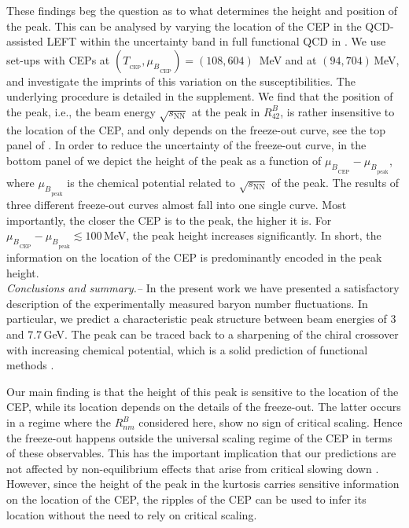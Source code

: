 \documentclass[reprint,twocolumn,superscriptaddress,preprintnumbers,amsmath,amssymb,aps,prd,floatfix]{revtex4-2}
\begin{document}
These findings beg the question as to what determines the height and position of the peak. This can be analysed by varying the location of the CEP in the QCD-assisted LEFT within the uncertainty band in full functional QCD in  . We use set-ups  with CEPs at $(T_{_{\mathrm{CEP}}},{\mu_B}_{_{\mathrm{CEP}}})=(108, 604)$ \,MeV and at $(94, 704)$\,MeV, and investigate the imprints of this variation on the susceptibilities. The underlying procedure is detailed in the supplement. We find that the position of the peak, i.e., the beam energy $\sqrt{s_{\mathrm{NN}}}$ at the peak in $R_{42}^B$, is rather insensitive to the location of the CEP, and only depends on the freeze-out curve, see the top panel of . In order to reduce the uncertainty of the freeze-out curve, in the bottom panel of  we depict the height of the peak as a function of  ${\mu_B}_{_{\mathrm{CEP}}}-{\mu_B}_{_{\mathrm{peak}}}$, where ${\mu_B}_{_{\mathrm{peak}}}$ is the chemical potential related to $\sqrt{s_{\mathrm{NN}}}$ of the peak. The results of three different freeze-out curves almost fall into one single curve. Most importantly, the closer the CEP is to the peak, the higher it is. For ${\mu_B}_{_{\mathrm{CEP}}}-{\mu_B}_{_{\mathrm{peak}}}\lesssim 100$\,MeV, the peak height increases significantly. In short, the information on the location of the CEP is predominantly encoded in the peak height. \\[-1.5ex] 


\emph{Conclusions and summary.--}
%
In the present work we have presented a satisfactory description of the experimentally measured baryon number fluctuations. In particular, we predict a characteristic peak structure between beam energies of 3 and 7.7\,GeV. The peak can be traced back to a sharpening of the chiral crossover with increasing chemical potential, which is a solid prediction of functional methods \cite{Fu:2019hdw, Gao:2020qsj, Gao:2020fbl, Gunkel:2021oya}. 

Our main finding is that the height of this peak is sensitive to the location of the CEP, while its location depends on the details of the freeze-out. The latter occurs in a regime where the $R_{nm}^B$ considered here, show no sign of critical scaling. Hence the freeze-out happens outside the universal scaling regime of the CEP in terms of these observables. This has the important implication that our predictions are not affected by non-equilibrium effects that arise from critical slowing down \cite{Berdnikov:1999ph, Mukherjee:2016kyu}.
However, since the height of the peak in the kurtosis carries sensitive information on the location of the CEP, the ripples of the CEP can be used to infer its location without the need to rely on critical scaling.
\end{document}
